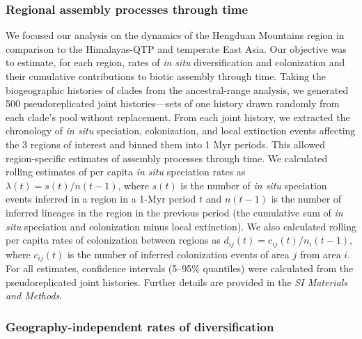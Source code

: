 \subsubsection{Regional assembly processes through time}

We focused our analysis on the dynamics of the Hengduan Mountains region in comparison to the Himalayas-QTP and temperate East Asia. Our objective was to estimate, for each region, rates of \textit{in situ} diversification and colonization and their cumulative contributions to biotic assembly through time. Taking the biogeographic histories of clades from the ancestral-range analysis, we generated 500 pseudoreplicated joint histories---sets of one history drawn randomly from each clade's pool without replacement. From each joint history, we extracted the chronology of \textit{in situ} speciation, colonization, and local extinction events affecting the 3 regions of interest and binned them into 1 Myr periods. This allowed region-specific estimates of assembly processes through time. We calculated rolling estimates of per capita \textit{in situ} speciation rates as $\lambda(t) = s(t)/n(t-1)$, where $s(t)$ is the number of \textit{in situ} speciation events inferred in a region in a 1-Myr period $t$ and $n(t-1)$ is the number of inferred lineages in the region in the previous period (the cumulative sum of \textit{in situ} speciation and colonization minus local extinction). We also calculated rolling per capita rates of colonization between regions as $d_{ij}(t) = c_{ij}(t)/n_i(t-1)$, where $c_{ij}(t)$ is the number of inferred colonization events of area $j$ from area $i$. For all estimates, confidence intervals (5--95\% quantiles) were calculated from the pseudoreplicated joint histories. Further details are provided in the \textit{SI Materials and Methods}.

\subsubsection{Geography-independent rates of diversification}


